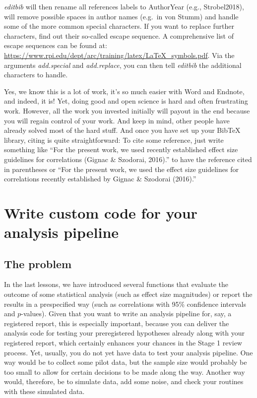 \documentclass[
]{article}
\begin{document}
\emph{editbib} will then rename all references labels to AuthorYear
(e.g., Strobel2018), will remove possible spaces in author names
(e.g.~in von Stumm) and handle some of the more common special
characters. If you want to replace further characters, find out their
so-called escape sequence. A comprehensive list of escape sequences can
be found at:
\url{https://www.rpi.edu/dept/arc/training/latex/LaTeX_symbols.pdf}. Via
the arguments \emph{add.special} and \emph{add.replace}, you can then
tell \emph{editbib} the additional characters to handle.

Yes, we know this is a lot of work, it's so much easier with Word and
Endnote, and indeed, it is! Yet, doing good and open science is hard and
often frustrating work. However, all the work you invested initially
will payout in the end because you will regain control of your work. And
keep in mind, other people have already solved most of the hard stuff.
And once you have set up your BibTeX library, citing is quite
straightforward: To cite some reference, just write something like ``For
the present work, we used recently established effect size guidelines
for correlations (Gignac \& Szodorai, 2016).'' to have the reference
cited in parentheses or ``For the present work, we used the effect size
guidelines for correlations recently established by Gignac \& Szodorai
(2016).''

\hypertarget{write-custom-code-for-your-analysis-pipeline}{%
\section{Write custom code for your analysis
pipeline}\label{write-custom-code-for-your-analysis-pipeline}}

\hypertarget{the-problem}{%
\subsection{The problem}\label{the-problem}}

In the last lessons, we have introduced several functions that evaluate
the outcome of some statistical analysis (such as effect size
magnitudes) or report the results in a prespecified way (such as
correlations with 95\% confidence intervals and \(p\)-values). Given
that you want to write an analysis pipeline for, say, a registered
report, this is especially important, because you can deliver the
analysis code for testing your preregistered hypotheses already along
with your registered report, which certainly enhances your chances in
the Stage 1 review process. Yet, usually, you do not yet have data to
test your analysis pipeline. One way would be to collect some pilot
data, but the sample size would probably be too small to allow for
certain decisions to be made along the way. Another way would,
therefore, be to simulate data, add some noise, and check your routines
with these simulated data.
\end{document}
